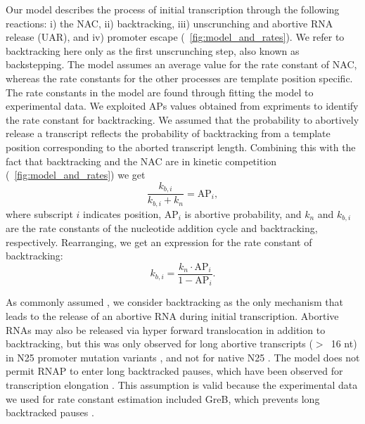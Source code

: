 %

Our model describes the process of initial transcription through the following
reactions: i) the NAC, ii) backtracking, iii) unscrunching and abortive RNA
release (UAR), and iv) promoter escape (\FIG~\ref{fig:model_and_rates}).  We
refer to backtracking here only as the first unscrunching step, also known as
backstepping. The model assumes an average value for the rate constant of
NAC, whereas the rate constants for the other processes are template position
specific. The rate constants in the model are found through fitting the
model to experimental data. We exploited APs values obtained from expriments
\cite{hsu_quantitative_1996} to identify the rate constant for
backtracking. We assumed that
the probability to abortively release a transcript reflects the probability of
backtracking from a template position corresponding to the aborted transcript
length. Combining this with the fact that backtracking and the NAC are in
kinetic competition (\FIG~\ref{fig:model_and_rates}) we get
\begin{equation*}
  \frac{k_{b,i}}{k_{b,i} + k_n} = \text{AP}_i,
\end{equation*}
where subscript $i$ indicates position, AP$_i$ is abortive probability, and
$k_n$ and $k_{b,i}$ are the rate constants of the nucleotide addition cycle
and backtracking, respectively. Rearranging, we get an expression for the
rate constant of backtracking:
\begin{equation}
  k_{b,i} = \frac{k_n\cdot\text{AP}_i}{1-\text{AP}_i}.
  \label{eq:backtrackingcalc}
\end{equation}

As commonly assumed \cite{xue_kinetic_2008,tang_real-time_2009}, we consider
backtracking as the only mechanism that leads to the release of an abortive
RNA during initial transcription. Abortive RNAs may also be released via hyper
forward translocation in addition to backtracking, but this was only observed
for long abortive transcripts ($>$~16 nt) in N25 promoter mutation variants
\cite{chander_alternate_2007, chander_mechanisms_2015}, and not for native N25
\cite{chander_alternate_2007}. The model does not permit RNAP to enter long
backtracked pauses, which have been observed for transcription elongation
\cite{shaevitz_backtracking_2003}. This assumption is valid because the
experimental data we used for rate constant estimation included GreB, which
prevents long backtracked pauses \cite{revyakin_abortive_2006,
shaevitz_backtracking_2003}.


